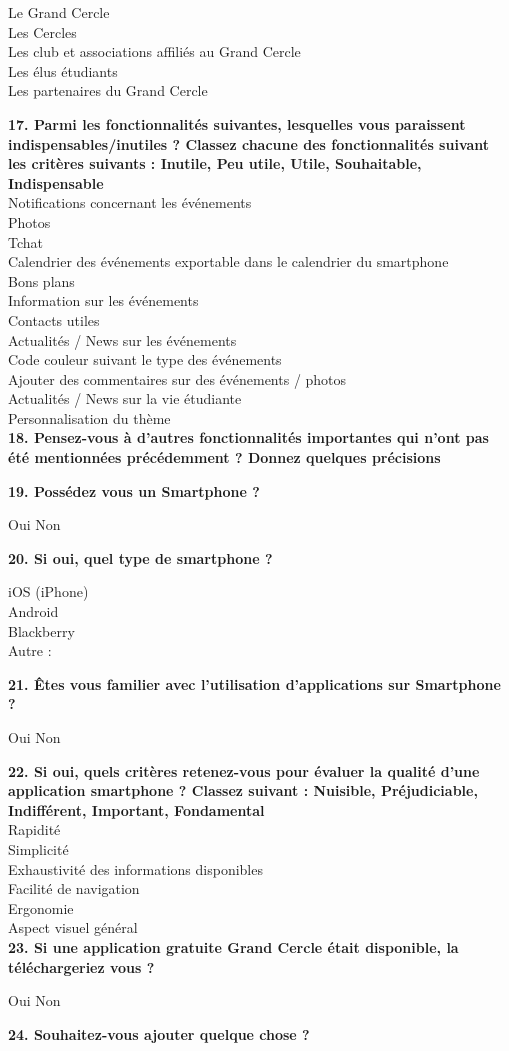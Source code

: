 \documentclass[a4paper, 11px]{article}
\begin{document}
\indent Le Grand Cercle\\
\indent Les Cercles\\
\indent Les club et associations affiliés au Grand Cercle\\
\indent Les élus étudiants\\
\indent Les partenaires du Grand Cercle


\textbf{17. Parmi les fonctionnalités suivantes, lesquelles vous paraissent indispensables/inutiles ?  Classez chacune des fonctionnalités suivant les critères suivants : Inutile, Peu utile, Utile, Souhaitable, Indispensable }\\
\indent Notifications concernant les événements \\							
\indent Photos 							\\
\indent Tchat 							\\
\indent Calendrier des événements exportable dans le calendrier du smartphone 	\\	
\indent Bons plans 		\\					
\indent Information sur les événements 	\\						
\indent Contacts utiles 				\\			
\indent Actualités / News sur les événements\\ 							
\indent Code couleur suivant le type des événements\\ 							
\indent Ajouter des commentaires sur des événements / photos\\ 					
\indent Actualités / News sur la vie étudiante 					\\		
\indent Personnalisation du thème 							\\

\textbf{18. Pensez-vous à d'autres fonctionnalités importantes qui n'ont pas été mentionnées précédemment ? Donnez quelques précisions}

\textbf{19. Possédez vous un Smartphone ? }

    Oui
    Non


\textbf{20. Si oui, quel type de smartphone ?}

\indent iOS (iPhone)\\
\indent Android\\
\indent Blackberry\\
\indent Autre : 


\textbf{21. Êtes vous familier avec l'utilisation d'applications sur Smartphone ? }

    Oui
    Non


\textbf{22. Si oui, quels critères retenez-vous pour évaluer la qualité d'une application smartphone ? Classez suivant : Nuisible, Préjudiciable, Indifférent, Important, Fondamental}\\
\indent Rapidité 		\\					
\indent Simplicité 	\\						
\indent Exhaustivité des informations disponibles 			\\				
\indent Facilité de navigation 							\\
\indent Ergonomie 							\\
\indent Aspect visuel général 					\\		

\textbf{23. Si une application gratuite Grand Cercle était disponible, la téléchargeriez vous ? }

    Oui
    Non


\textbf{24. Souhaitez-vous ajouter quelque chose ?}
\end{document}
